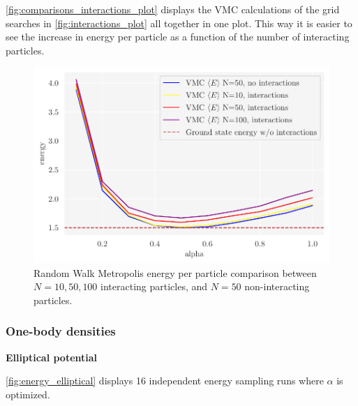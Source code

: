 \autoref{fig:comparisons_interactions_plot} displays the VMC calculations of the grid searches in \autoref{fig:interactions_plot} all together in one plot. This way it is easier to see the increase in energy per particle as a function of the number of interacting particles. 

\begin{figure}[H]
\begin{center}\includegraphics[scale=1.0]{latex/figures/grid_search_analytical_w_interactions_all_N.pdf}
\end{center}
\caption{Random Walk Metropolis energy per particle comparison between $N=10, 50, 100$ interacting particles, and $N=50$ non-interacting particles.}
\label{fig:comparisons_interactions_plot}
\end{figure}

\subsubsection{One-body densities}

\textbf{Elliptical potential}

\autoref{fig:energy_elliptical} displays 16 independent energy sampling runs where $\alpha$ is optimized. 

